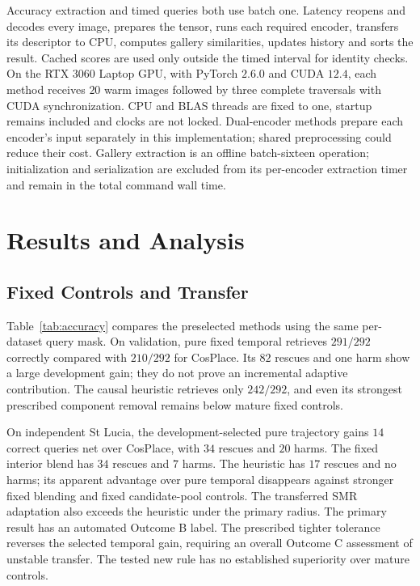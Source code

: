 \documentclass[conference]{IEEEtran}
\begin{document}
Accuracy extraction and timed queries both use batch one. Latency reopens and decodes every image, prepares the tensor, runs each required encoder, transfers its descriptor to CPU, computes gallery similarities, updates history and sorts the result. Cached scores are used only outside the timed interval for identity checks. On the RTX 3060 Laptop GPU, with PyTorch $2.6.0$ and CUDA $12.4$, each method receives $20$ warm images followed by three complete traversals with CUDA synchronization. CPU and BLAS threads are fixed to one, startup remains included and clocks are not locked. Dual-encoder methods prepare each encoder's input separately in this implementation; shared preprocessing could reduce their cost. Gallery extraction is an offline batch-sixteen operation; initialization and serialization are excluded from its per-encoder extraction timer and remain in the total command wall time.

\section{Results and Analysis}
\subsection{Fixed Controls and Transfer}
Table~\ref{tab:accuracy} compares the preselected methods using the same per-dataset query mask. On validation, pure fixed temporal retrieves $291/292$ correctly compared with $210/292$ for CosPlace. Its $82$ rescues and one harm show a large development gain; they do not prove an incremental adaptive contribution. The causal heuristic retrieves only $242/292$, and even its strongest prescribed component removal remains below mature fixed controls.

On independent St Lucia, the development-selected pure trajectory gains $14$ correct queries net over CosPlace, with $34$ rescues and $20$ harms. The fixed interior blend has $34$ rescues and $7$ harms. The heuristic has $17$ rescues and no harms; its apparent advantage over pure temporal disappears against stronger fixed blending and fixed candidate-pool controls. The transferred SMR adaptation also exceeds the heuristic under the primary radius. The primary result has an automated Outcome B label. The prescribed tighter tolerance reverses the selected temporal gain, requiring an overall Outcome C assessment of unstable transfer. The tested new rule has no established superiority over mature controls.
\end{document}
